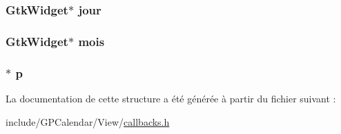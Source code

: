 \hypertarget{struct_data_a366c31a9b090d9870030fe2ac52d6e46}{
\subsubsection[{jour}]{\setlength{\rightskip}{0pt plus 5cm}Gtk\-Widget$\ast$ jour}}\label{struct_data_a366c31a9b090d9870030fe2ac52d6e46}
\hypertarget{struct_data_a430ab7341bb11cda80f096a2ec12d8d7}{
\subsubsection[{mois}]{\setlength{\rightskip}{0pt plus 5cm}Gtk\-Widget$\ast$ mois}}\label{struct_data_a430ab7341bb11cda80f096a2ec12d8d7}
\hypertarget{struct_data_ab6da0510b3f88800fe3d3ee7e9cd9d7b}{
\subsubsection[{p}]{$\ast$ p}}\label{struct_data_ab6da0510b3f88800fe3d3ee7e9cd9d7b}


La documentation de cette structure a été générée à partir du fichier suivant \-:\begin{DoxyCompactItemize}
\item 
include/\-G\-P\-Calendar/\-View/\hyperlink{callbacks_8h}{callbacks.\-h}\end{DoxyCompactItemize}
